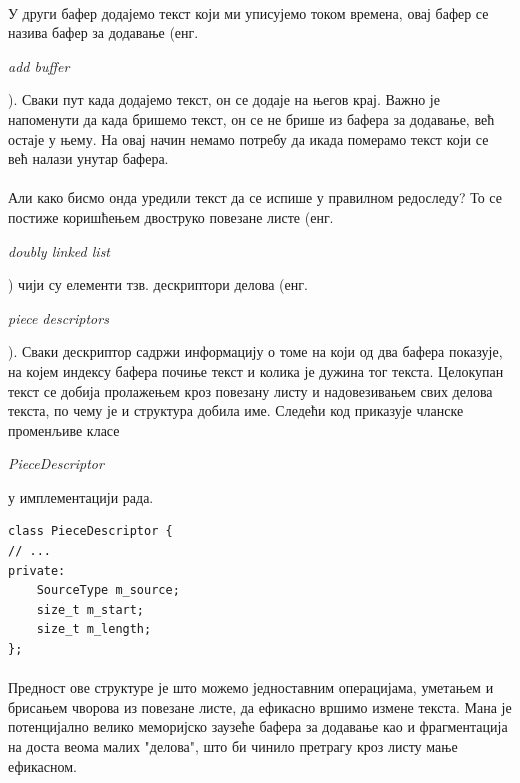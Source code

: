\documentclass[12pt,oneside]{memoir}
\begin{document}
\paragraph{}
У други бафер додајемо текст који ми уписујемо током времена, овај бафер се
назива бафер за додавање (енг. \begin{latinica}\textit{add buffer}\end{latinica}). Сваки пут
када додајемо текст, он се додаје на његов крај. Важно је напоменути да када бришемо
текст, он се не брише из бафера за додавање, већ остаје у њему. На овај начин немамо потребу
да икада померамо текст који се већ налази унутар бафера.

\paragraph{}
Али како бисмо онда уредили текст да се испише у правилном редоследу? То се постиже
коришћењем двоструко повезане листе (енг. \begin{latinica}\textit{doubly linked list}
\end{latinica}) чији су елементи тзв. дескриптори делова (енг. \begin{latinica}
\textit{piece descriptors}\end{latinica}). Сваки дескриптор садржи информацију о томе на који од
два бафера показује, на којем индексу бафера почиње текст и колика је дужина тог текста. 
Целокупан текст се добија пролажењем кроз повезану листу и надовезивањем свих делова текста, 
по чему је и структура добила име. Следећи код приказује чланске променљиве класе \begin{latinica}
\textit{PieceDescriptor}\end{latinica} у имплементацији рада.

\begin{lstlisting}
class PieceDescriptor {
// ...
private:
    SourceType m_source;
    size_t m_start;
    size_t m_length;
};
\end{lstlisting}

\paragraph{}
Предност ове структуре је што можемо једноставним операцијама, уметањем и брисањем чворова из
повезане листе, да ефикасно вршимо измене текста. Мана је потенцијално велико меморијско заузеће
бафера за додавање као и фрагментација на доста веома малих "делова", што би чинило претрагу
кроз листу мање ефикасном.
\end{document}
